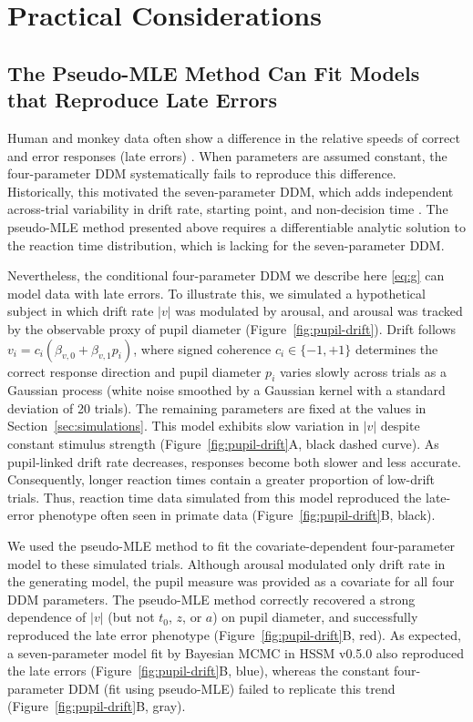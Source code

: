 \documentclass[00-main.tex]{subfiles}
\begin{document}
\section{Practical Considerations}\label{sec:practical-consideration}

\subsection*{The Pseudo-MLE Method Can Fit Models that Reproduce Late Errors}
Human and monkey data often show a difference in the relative speeds of correct and error responses (late errors) \citep{ratcliff_diffusion_2008, ratcliff_diffusion_2016, roitman_response_2002, shevinsky_interaction_2019}. When parameters are assumed constant, the four-parameter DDM systematically fails to reproduce this difference. Historically, this motivated the seven-parameter DDM, which adds independent across-trial variability in drift rate, starting point, and non-decision time \citep{ratcliff_theory_1978, ratcliff_modeling_1998, ratcliff_diffusion_2008}. The pseudo-MLE method presented above requires a differentiable analytic solution to the reaction time distribution, which is lacking for the seven-parameter DDM.

Nevertheless, the conditional four-parameter DDM we describe here \eqref{eq:g} can model data with late errors.  To illustrate this, we simulated a hypothetical subject in which drift rate $|v|$ was modulated by arousal, and arousal was tracked by the observable proxy of pupil diameter (Figure~\ref{fig:pupil-drift}).  Drift follows $v_i = c_i(\beta_{v,0} + \beta_{v,1}p_i)$, where signed coherence $c_i \in \{-1,+1\}$ determines the correct response direction and pupil diameter $p_i$ varies slowly across trials as a Gaussian process (white noise smoothed by a Gaussian kernel with a standard deviation of 20 trials). The remaining parameters are fixed at the values in Section~\ref{sec:simulations}. This model exhibits slow variation in $|v|$ despite constant stimulus strength (Figure~\ref{fig:pupil-drift}A, black dashed curve). As pupil-linked drift rate decreases, responses become both slower and less accurate. Consequently, longer reaction times contain a greater proportion of low-drift trials. Thus, reaction time data simulated from this model reproduced the late-error phenotype often seen in primate data (Figure~\ref{fig:pupil-drift}B, black).

We used the pseudo-MLE method to fit the covariate-dependent four-parameter model to these simulated trials. Although arousal modulated only drift rate in the generating model, the pupil measure was provided as a covariate for all four DDM parameters. The pseudo-MLE method correctly recovered a strong dependence of $|v|$ (but not $t_0$, $z$, or $a$) on pupil diameter, and successfully reproduced the late error phenotype (Figure~\ref{fig:pupil-drift}B, red). As expected, a seven-parameter model fit by Bayesian MCMC in HSSM v0.5.0 \citep{fengler_hssm_2026} also reproduced the late errors (Figure~\ref{fig:pupil-drift}B, blue), whereas the constant four-parameter DDM (fit using pseudo-MLE) failed to replicate this trend (Figure~\ref{fig:pupil-drift}B, gray).
\end{document}
